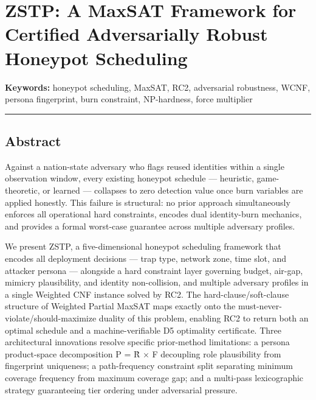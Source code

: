 \documentclass[
  11pt,
]{article}
\author{}
\date{}
\begin{document}
\hypertarget{zstp-a-maxsat-framework-for-certified-adversarially-robust-honeypot-scheduling}{%
\section{ZSTP: A MaxSAT Framework for Certified Adversarially Robust
Honeypot
Scheduling}\label{zstp-a-maxsat-framework-for-certified-adversarially-robust-honeypot-scheduling}}

\textbf{Keywords:} honeypot scheduling, MaxSAT, RC2, adversarial
robustness, WCNF, persona fingerprint, burn constraint, NP-hardness,
force multiplier

\begin{center}\rule{0.5\linewidth}{0.5pt}\end{center}

\hypertarget{abstract}{%
\subsection{Abstract}\label{abstract}}

Against a nation-state adversary who flags reused identities within a
single observation window, every existing honeypot schedule ---
heuristic, game-theoretic, or learned --- collapses to zero detection
value once burn variables are applied honestly. This failure is
structural: no prior approach simultaneously enforces all operational
hard constraints, encodes dual identity-burn mechanics, and provides a
formal worst-case guarantee across multiple adversary profiles.

We present ZSTP, a five-dimensional honeypot scheduling framework that
encodes all deployment decisions --- trap type, network zone, time slot,
and attacker persona --- alongside a hard constraint layer governing
budget, air-gap, mimicry plausibility, and identity non-collision, and
multiple adversary profiles in a single Weighted CNF instance solved by
RC2. The hard-clause/soft-clause structure of Weighted Partial MaxSAT
maps exactly onto the must-never-violate/should-maximize duality of this
problem, enabling RC2 to return both an optimal schedule and a
machine-verifiable D5 optimality certificate. Three architectural
innovations resolve specific prior-method limitations: a persona
product-space decomposition P = R̂ × F decoupling role plausibility from
fingerprint uniqueness; a path-frequency constraint split separating
minimum coverage frequency from maximum coverage gap; and a multi-pass
lexicographic strategy guaranteeing tier ordering under adversarial
pressure.
\end{document}

